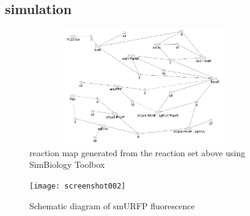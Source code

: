\subsection{simulation }
\begin{figure}[h]
	\centering
	\includegraphics[width=10cm,height=5cm]{screenshot003}	
	\caption{reaction map generated from the reaction set above using SimBiology Toolbox}
\end{figure}

\begin{figure}[h]
	\centering
	\texttt{[image: screenshot002]}
	\caption{Schematic diagram of smURFP fluorescence}
\end{figure}







